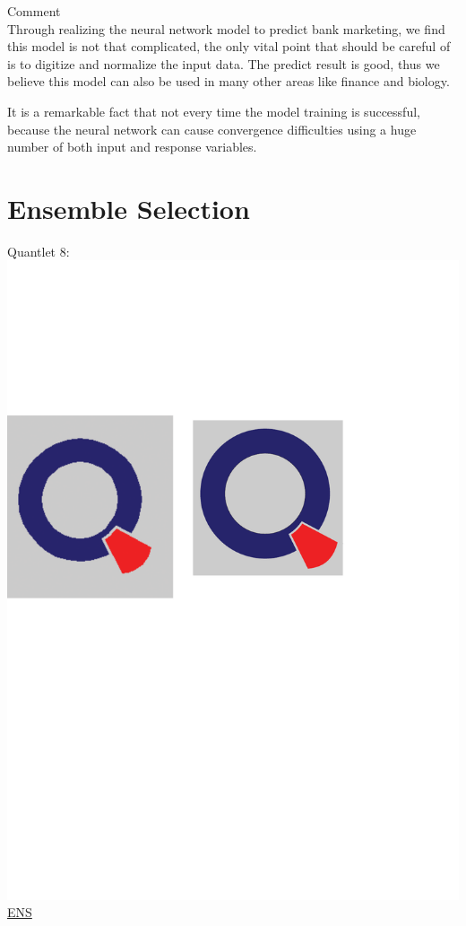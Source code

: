 \documentclass[12pt, a4paper, bibliography=totoc, english]{scrartcl}
\begin{document}
\textbullet\quad Comment\\
Through realizing the neural network model to predict bank marketing, we find this model is not that complicated, the only vital point that should be careful of is to digitize and normalize the input data. The predict result is good, thus we believe this model can also be used in many other areas like finance and biology. 

It is a remarkable fact that not every time the model training is successful, because the neural network can cause convergence difficulties using a huge number of both input and response variables. 

\section{Ensemble Selection}
Quantlet 8:\includegraphics[scale=0.08]{qletlogo}
\textcolor{blue}{\href{https://github.com/JingyiLiu3136/MLFBM/tree/master/ENS}{ENS}}\vspace{3mm}\\
\end{document}
